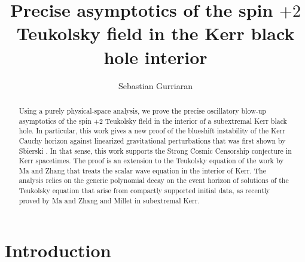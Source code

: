 \documentclass[reqno]{amsart}
\title{Precise asymptotics of the spin $+2$ Teukolsky field in the Kerr black hole interior}
\author[Sebastian Gurriaran]{Sebastian Gurriaran}
\numberwithin{equation}{section}
\theoremstyle{plain}
\theoremstyle{definition}
\theoremstyle{remark}
\numberwithin{equation}{section}
\begin{document}
\begin{abstract}

    Using a purely physical-space analysis, we prove the precise oscillatory blow-up asymptotics of the spin $+2$ Teukolsky field in the interior of a subextremal Kerr black hole. In particular, this work gives a new proof of the blueshift instability of the Kerr Cauchy horizon against linearized gravitational perturbations that was first shown by Sbierski \cite{sbierski}. In that sense, this work supports the Strong Cosmic Censorship conjecture in Kerr spacetimes. The proof is an extension to the Teukolsky equation of the work \cite{scalarMZ} by Ma and Zhang that treats the scalar wave equation in the interior of Kerr. The analysis relies on the generic polynomial decay on the event horizon of solutions of the Teukolsky equation that arise from compactly supported initial data, as recently proved by Ma and Zhang \cite{pricelaw} and Millet \cite{millet} in subextremal Kerr.

\end{abstract}

\maketitle

\tableofcontents




\section{Introduction}
\end{document}
